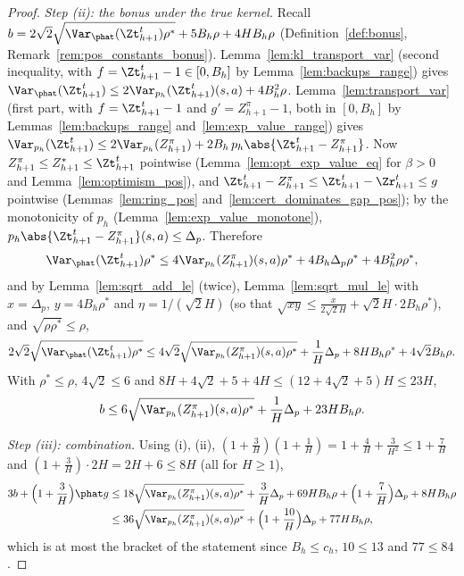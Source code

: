 \begin{proof}
\emph{Step (ii): the bonus under the true kernel.} Recall
$b = 2\sqrt2\sqrt{\Var_{\phat}(\Zt^t_{h+1})\rho^*} + 5B_h\rho + 4HB_h\rho$ (Definition~\ref{def:bonus},
Remark~\ref{rem:pos_constants_bonus}). Lemma~\ref{lem:kl_transport_var} (second inequality, with
$f = \Zt^t_{h+1} - 1 \in [0, B_h]$ by Lemma~\ref{lem:backups_range}) gives
$\Var_{\phat}(\Zt^t_{h+1}) \le 2\Var_{p_h}(\Zt^t_{h+1})(s,a) + 4B_h^2\rho$.
Lemma~\ref{lem:transport_var} (first part, with $f = \Zt^t_{h+1} - 1$ and $g' = Z^\pi_{h+1} - 1$, both in
$[0, B_h]$ by Lemmas~\ref{lem:backups_range} and~\ref{lem:exp_value_range}) gives
$\Var_{p_h}(\Zt^t_{h+1}) \le 2\Var_{p_h}(Z^\pi_{h+1}) + 2B_h\,p_h\abs{\Zt^t_{h+1} - Z^\pi_{h+1}}$. Now
$Z^\pi_{h+1} \le Z^*_{h+1} \le \Zt^t_{h+1}$ pointwise (Lemma~\ref{lem:opt_exp_value_eq} for $\beta > 0$ and
Lemma~\ref{lem:optimism_pos}), and
$\Zt^t_{h+1} - Z^\pi_{h+1} \le \Zt^t_{h+1} - \Zr^t_{h+1} \le g$ pointwise
(Lemmas~\ref{lem:ring_pos} and~\ref{lem:cert_dominates_gap_pos}); by the monotonicity of $p_h$
(Lemma~\ref{lem:exp_value_monotone}), $p_h\abs{\Zt^t_{h+1} - Z^\pi_{h+1}}(s,a) \le \Delta_p$. Therefore
\[
  \Var_{\phat}(\Zt^t_{h+1})\rho^* \le 4\Var_{p_h}(Z^\pi_{h+1})(s,a)\rho^* + 4B_h\Delta_p\rho^* + 4B_h^2\rho\rho^* ,
\]
and by Lemma~\ref{lem:sqrt_add_le} (twice), Lemma~\ref{lem:sqrt_mul_le} with $x = \Delta_p$,
$y = 4B_h\rho^*$ and $\eta = 1/(\sqrt2 H)$ (so that $\sqrt{xy} \le \frac{x}{2\sqrt2 H} + \sqrt2 H\cdot 2B_h\rho^*$),
and $\sqrt{\rho\rho^*} \le \rho$,
\[
  2\sqrt2\sqrt{\Var_{\phat}(\Zt^t_{h+1})\rho^*}
  \le 4\sqrt2\sqrt{\Var_{p_h}(Z^\pi_{h+1})(s,a)\rho^*} + \frac1H\Delta_p + 8HB_h\rho^* + 4\sqrt2 B_h\rho .
\]
With $\rho^* \le \rho$, $4\sqrt2 \le 6$ and $8H + 4\sqrt2 + 5 + 4H \le (12 + 4\sqrt2 + 5)H \le 23H$,
\[
  b \le 6\sqrt{\Var_{p_h}(Z^\pi_{h+1})(s,a)\rho^*} + \frac1H\Delta_p + 23 H B_h\rho .
\]

\emph{Step (iii): combination.} Using (i), (ii), $(1 + \frac3H)(1 + \frac1H) = 1 + \frac4H + \frac3{H^2} \le 1 + \frac7H$
and $(1 + \frac3H)\cdot 2H = 2H + 6 \le 8H$ (all for $H \ge 1$),
\begin{align*}
  3b + \Big(1 + \frac3H\Big)\phat g
  &\le 18\sqrt{\Var_{p_h}(Z^\pi_{h+1})(s,a)\rho^*} + \frac3H\Delta_p + 69HB_h\rho
     + \Big(1 + \frac7H\Big)\Delta_p + 8HB_h\rho \\
  &\le 36\sqrt{\Var_{p_h}(Z^\pi_{h+1})(s,a)\rho^*} + \Big(1 + \frac{10}{H}\Big)\Delta_p + 77 H B_h\rho ,
\end{align*}
which is at most the bracket of the statement since $B_h \le c_h$, $10 \le 13$ and $77 \le 84$.
\end{proof}


